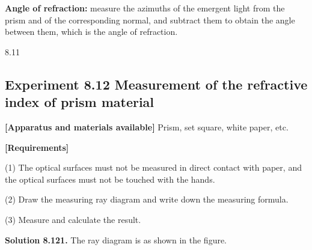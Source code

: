 \textbf{Angle of refraction:} measure the azimuths of the emergent light from the prism and of the corresponding normal, and subtract them to obtain the angle between them, which is the angle of refraction.

\begin{figbox}{8.11}
\end{figbox}

\subsection*{Experiment 8.12 \quad Measurement of the refractive index of prism material}

\textbf{[Apparatus and materials available]} Prism, set square, white paper, etc.

\textbf{[Requirements]}

(1) The optical surfaces must not be measured in direct contact with paper, and the optical surfaces must not be touched with the hands.

(2) Draw the measuring ray diagram and write down the measuring formula.

(3) Measure and calculate the result.

\textbf{Solution 8.12}\quad \textbf{1.} The ray diagram is as shown in the figure.

